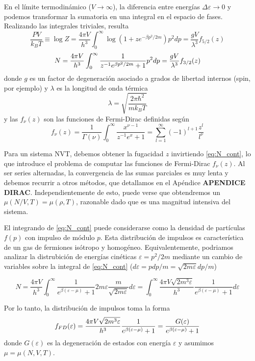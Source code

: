 En el límite termodinámico ($V\to\infty$), la diferencia entre energías $\Delta\varepsilon\to 0$ y podemos transformar la sumatoria en una integral en el espacio de fases.
Realizando las integrales triviales, resulta
\begin{equation}
 \frac{PV}{k_BT} \equiv \log Z = \frac{4\pi V}{h^3} \int_0^\infty \log(1+ze^{-\beta p^2/2m})p^2dp = \frac{gV}{\lambda^3}f_{5/2}(z)
\end{equation}
\begin{equation}{\label{eq:N_cont}}
 N = \frac{4\pi V}{h^3} \int_0^\infty \frac{1}{z^{-1}e^{\beta p^2/2m}+1} p^2dp = \frac{gV}{\lambda^3}f_{3/2}(z)
\end{equation}
donde $g$ es un factor de degeneración asociado a grados de libertad internos (spin, por ejemplo) y  $\lambda$ es la longitud de onda térmica
\[ \lambda = \sqrt{ \frac{2\pi\hbar^2}{mk_BT} } \]
y las $f_\nu(z)$ son las funciones de Fermi-Dirac definidas según
\[ f_\nu(z) = \frac{1}{\Gamma(\nu)}\int_0^\infty \frac{x^{\nu-1}}{z^{-1}e^x+1} = \sum_{l=1}^\infty (-1)^{l+1}\frac{z^l}{l^\nu}\]

Para un sistema NVT, debemos obtener la fugacidad $z$ invirtiendo \eqref{eq:N_cont}, lo que introduce el problema de computar las funciones de Fermi-Dirac $f_\nu(z)$.
Al ser series alternadas, la convergencia de las sumas parciales es muy lenta y debemos recurrir a otros métodos, que detallamos en el Apéndice \textbf{APENDICE DIRAC}.
Independientemente de esto, puede verse que obtendremos un $\mu(N/V,T) = \mu(\rho, T)$, razonable dado que es una magnitud intensiva del sistema.

El integrando de \eqref{eq:N_cont} puede considerarse como la densidad de partículas $f(p)$ con impulso de módulo $p$.
Esta distribución de impulsos es característica de un gas de fermiones isótropo y homogéneo.
Equivalentemente, podriamos analizar la distrubición de energías cinéticas $\varepsilon=p^2/2m$ mediante un cambio de variables sobre la integral de \eqref{eq:N_cont} 
($d\varepsilon = pdp/m = \sqrt{2m\varepsilon}dp/m$)

\[ N = \frac{4\pi V}{h^3} \int_0^\infty \frac{1}{e^{\beta(\varepsilon-\mu)}+1} 2m\varepsilon\frac{m}{\sqrt{2m\varepsilon}}d\varepsilon = 
\int_0^\infty \frac{4\pi V\sqrt{2m^3\varepsilon}}{h^3}\frac{1}{e^{\beta(\varepsilon-\mu)}+1} d\varepsilon\]

Por lo tanto, la distribución de impulsos toma la forma 
\begin{equation}{\label{eq:dist_FD}}
 f_{FD}(\varepsilon) = \frac{4\pi V \sqrt{2m^3\varepsilon}}{h^3}\frac{1}{e^{\beta(\varepsilon-\mu)}+1} = \frac{G(\varepsilon)}{e^{\beta(\varepsilon-\mu)}+1} 
\end{equation}
donde $G(\varepsilon)$ es la degeneración de estados con energía $\varepsilon$ y asumimos $\mu=\mu(N,V,T)$.

